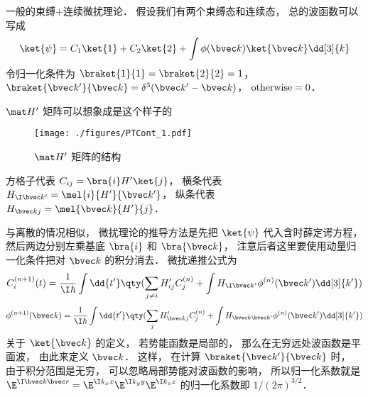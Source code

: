 
\begin{issues}
\issueDraft
\issueNeedCite
\end{issues}



一般的束缚+连续微扰理论． 假设我们有两个束缚态和连续态， 总的波函数可以写成
 \begin{equation}
\ket{\psi} = C_1\ket{1} + C_2\ket{2} + \int \phi (\bvec k)\ket{\bvec k} \dd[3]{k}
\end{equation}
令归一化条件为 $\braket{1}{1} = \braket{2}{2} = 1$，  $\braket{\bvec k'}{\bvec k}  = \delta ^3 (\bvec k' - \bvec k)$，  $\rm{otherwise} = 0$． 

 $\mat H'$  矩阵可以想象成是这个样子的
\begin{figure}[ht]
\centering
\texttt{[image: ./figures/PTCont\_1.pdf]}
\caption{$\mat H'$ 矩阵的结构} 
\end{figure}

方格子代表 $C_{ij} = \bra{i} H' \ket{j}$， 横条代表 $H_{\I\bvec k'} = \mel{i}{H'}{\bvec k'}$，  纵条代表 $H_{\bvec k j} = \mel{\bvec k}{H'}{j}$． 

与离散的情况相似， 微扰理论的推导方法是先把 $\ket{\psi}$ 代入含时薛定谔方程， 然后两边分别左乘基底 $\bra{i}$ 和 $\bra{\bvec k}$，  注意后者这里要使用动量归一化条件把对 $\bvec k$ 的积分消去． 微扰递推公式为
 \begin{equation}
C_i^{(n + 1)}(t) = \frac{1}{\I\hbar} \int \dd{t'} \qty(\sum_{j \ne i} H'_{ij} C_j^{(n)} + \int H_{\I\bvec k'} \phi ^{(n)} (\bvec k') \dd[3]{k'} )
\end{equation}
\begin{equation}
\phi^{(n+1)}(\bvec k) = \frac{1}{\I\hbar} \int \dd{t'} \qty(\sum_j H'_{\bvec kj} C_j^{(n)} + \int H_{\bvec k\bvec k'} \phi ^{(n)}(\bvec k') \dd[3]{k'})
\end{equation}
关于 $\ket{\bvec k}$  的定义， 若势能函数是局部的， 那么在无穷远处波函数是平面波， 由此来定义 $\bvec k$．  这样， 在计算 $\braket{\bvec k'}{\bvec k}$ 时， 由于积分范围是无穷， 可以忽略局部势能对波函数的影响， 所以归一化系数就是 $\E^{\I \bvec k\bvec r} = \E^{\I k_x x} \E^{\I k_y y} \E^{\I k_z z}$ 的归一化系数即 $1/{(2\pi )^{3/2}}$． 
 
